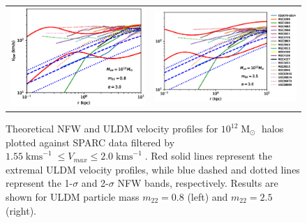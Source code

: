 \documentclass[a4paper,11pt]{article}
\begin{document}
\begin{figure}
\begin{tabular}{cc}
{\includegraphics[scale = 0.65, trim={2.5cm 2.5cm 2.1cm 0.1cm}]{pics/v_12_8_3_paper.eps}} &
{\includegraphics[scale = 0.65, trim={2.1cm 2.5cm 0cm 0.1cm}]{pics/v_12_25_3_paper.eps}}
\end{tabular}
\caption{Theoretical NFW and ULDM velocity profiles for $10^{12}\operatorname{M}_{\odot}$ halos plotted against SPARC data filtered by $1.55 \operatorname{kms}^{-1}\leq V_{max}\leq 2.0 \operatorname{kms}^{-1}$. Red solid lines represent the extremal ULDM velocity profiles, while  blue dashed and dotted lines represent the 1-$\sigma$ and 2-$\sigma$ NFW bands, respectively. Results are shown for ULDM particle mass $m_{22} = 0.8$ (left) and $m_{22} = 2.5 $ (right). }\label{fig:velocity_12}
\end{figure}
\end{document}
